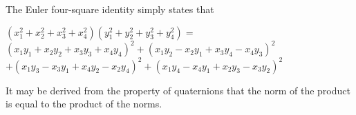 \documentclass[12pt]{article}
\begin{document}
The Euler four-square identity simply states that

$(x_1^2 + x_2^2 + x_3^2 + x_4^2)(y_1^2 + y_2^2 + y_3^2 + y_4^2) =$
$(x_1y_1 + x_2y_2 + x_3y_3 + x_4y_4)^2 + (x_1y_2 - x_2y_1 + x_3y_4 - x_4y_3)^2$
$+ (x_1y_3 - x_3y_1 + x_4y_2 - x_2y_4)^2 + (x_1y_4 - x_4y_1 + x_2y_3 - x_3y_2)^2$

It may be derived from the property of quaternions that the norm of the product is equal to the product of the norms.
\end{document}
